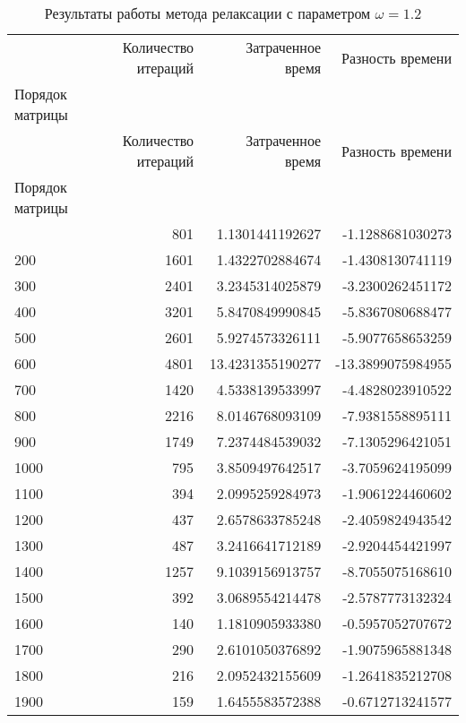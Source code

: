 \begin{longtable}{lrrr}
\caption{Результаты работы метода релаксации с параметром $\omega=1.2$}\\
\toprule
 & Количество итераций & Затраченное время & Разность времени \\
Порядок матрицы &  &  &  \\
\midrule
\endfirsthead
\toprule
 & Количество итераций & Затраченное время & Разность времени \\
Порядок матрицы &  &  &  \\
\midrule
\endhead
\midrule
\midrule
\endfoot
\bottomrule
\endlastfoot
100 & 801 & 1.1301441192627 & -1.1288681030273 \\
200 & 1601 & 1.4322702884674 & -1.4308130741119 \\
300 & 2401 & 3.2345314025879 & -3.2300262451172 \\
400 & 3201 & 5.8470849990845 & -5.8367080688477 \\
500 & 2601 & 5.9274573326111 & -5.9077658653259 \\
600 & 4801 & 13.4231355190277 & -13.3899075984955 \\
700 & 1420 & 4.5338139533997 & -4.4828023910522 \\
800 & 2216 & 8.0146768093109 & -7.9381558895111 \\
900 & 1749 & 7.2374484539032 & -7.1305296421051 \\
1000 & 795 & 3.8509497642517 & -3.7059624195099 \\
1100 & 394 & 2.0995259284973 & -1.9061224460602 \\
1200 & 437 & 2.6578633785248 & -2.4059824943542 \\
1300 & 487 & 3.2416641712189 & -2.9204454421997 \\
1400 & 1257 & 9.1039156913757 & -8.7055075168610 \\
1500 & 392 & 3.0689554214478 & -2.5787773132324 \\
1600 & 140 & 1.1810905933380 & -0.5957052707672 \\
1700 & 290 & 2.6101050376892 & -1.9075965881348 \\
1800 & 216 & 2.0952432155609 & -1.2641835212708 \\
1900 & 159 & 1.6455583572388 & -0.6712713241577 \\
\end{longtable}
